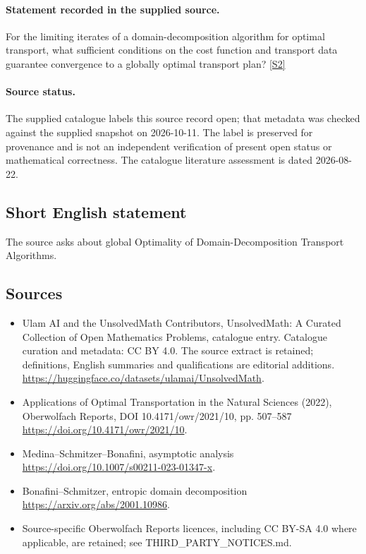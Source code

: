 \documentclass[11pt]{article}
\begin{document}
\paragraph{Statement recorded in the supplied source.}
For the limiting iterates of a domain-decomposition algorithm for optimal transport, what sufficient conditions on the cost function and transport data guarantee convergence to a globally optimal transport plan? \href{https://doi.org/10.4171/owr/2021/10}{[S2]}
\paragraph{Source status.}
The supplied catalogue labels this source record open; that metadata was checked against the supplied snapshot on 2026-10-11. The label is preserved for provenance and is not an independent verification of present open status or mathematical correctness. The catalogue literature assessment is dated 2026-08-22.
\subsection{Short English statement}
The source asks about global Optimality of Domain-Decomposition Transport Algorithms.
\subsection{Sources}
\begin{itemize}
\item[S1] Ulam AI and the UnsolvedMath Contributors, UnsolvedMath: A Curated Collection of Open Mathematics Problems, catalogue entry. Catalogue curation and metadata: CC BY 4.0. The source extract is retained; definitions, English summaries and qualifications are editorial additions.
\url{https://huggingface.co/datasets/ulamai/UnsolvedMath}.
\item[S2] Applications of Optimal Transportation in the Natural Sciences (2022), Oberwolfach Reports, DOI 10.4171/owr/2021/10, pp. 507--587
\url{https://doi.org/10.4171/owr/2021/10}.
\item[S3] Medina--Schmitzer--Bonafini, asymptotic analysis
\url{https://doi.org/10.1007/s00211-023-01347-x}.
\item[S4] Bonafini--Schmitzer, entropic domain decomposition
\url{https://arxiv.org/abs/2001.10986}.
\item Source-specific Oberwolfach Reports licences, including CC BY-SA 4.0 where applicable, are retained; see THIRD\_PARTY\_NOTICES.md.
\end{itemize}
\end{document}
